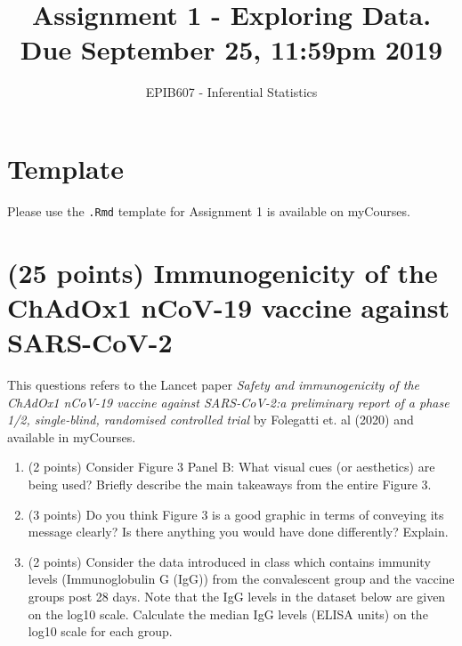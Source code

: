 \documentclass[letterpaper,12pt,twoside,]{pinp}
\title{Assignment 1 - Exploring Data. Due September 25, 11:59pm 2019}
\author[a]{EPIB607 - Inferential Statistics}
\affil[a]{Fall 2020, McGill University}
\providecommand{\tightlist}{%
  \setlength{\itemsep}{0pt}\setlength{\parskip}{0pt}}
\begin{document}
\verticaladjustment{-2pt}

\maketitle
\thispagestyle{firststyle}



\hypertarget{template}{%
\section*{Template}\label{template}}

Please use the \texttt{.Rmd} template for Assignment 1 is available on
myCourses.

\hypertarget{points-immunogenicity-of-the-chadox1-ncov-19-vaccine-against-sars-cov-2}{%
\section{(25 points) Immunogenicity of the ChAdOx1 nCoV-19 vaccine
against
SARS-CoV-2}\label{points-immunogenicity-of-the-chadox1-ncov-19-vaccine-against-sars-cov-2}}

This questions refers to the Lancet paper \emph{Safety and
immunogenicity of the ChAdOx1 nCoV-19 vaccine against SARS-CoV-2:a
preliminary report of a phase 1/2, single-blind, randomised controlled
trial} by Folegatti et. al (2020) and available in myCourses.

\begin{enumerate}
\def\labelenumi{\alph{enumi})}
\tightlist
\item
  (2 points) Consider Figure 3 Panel B: What visual cues (or aesthetics)
  are being used? Briefly describe the main takeaways from the entire
  Figure 3.
\item
  (3 points) Do you think Figure 3 is a good graphic in terms of
  conveying its message clearly? Is there anything you would have done
  differently? Explain.
\item
  (2 points) Consider the data introduced in class which contains
  immunity levels (Immunoglobulin G (IgG)) from the convalescent group
  and the vaccine groups post 28 days. Note that the IgG levels in the
  dataset below are given on the log10 scale. Calculate the median IgG
  levels (ELISA units) on the log10 scale for each group.
\end{enumerate}
\end{document}
